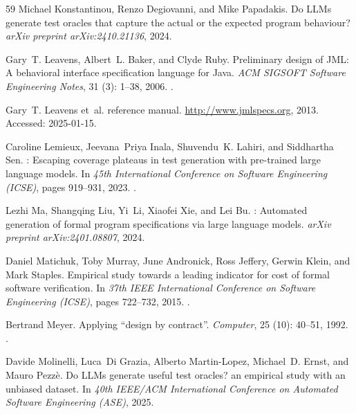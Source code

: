 \documentclass[11pt]{article}
\begin{document}
\begin{thebibliography}{59}
Michael Konstantinou, Renzo Degiovanni, and Mike Papadakis.
\newblock Do {LLM}s generate test oracles that capture the actual or the
  expected program behaviour?
\newblock \emph{arXiv preprint arXiv:2410.21136}, 2024.

Gary~T. Leavens, Albert~L. Baker, and Clyde Ruby.
\newblock Preliminary design of {JML}: A behavioral interface specification
  language for {Java}.
\newblock \emph{ACM SIGSOFT Software Engineering Notes}, 31
  (3): 1--38, 2006.
\newblock {}.

Gary~T. Leavens et~al.
 reference manual.
\newblock \url{http://www.jmlspecs.org}, 2013.
\newblock Accessed: 2025-01-15.

Caroline Lemieux, Jeevana~Priya Inala, Shuvendu~K. Lahiri, and Siddhartha Sen.
: Escaping coverage plateaus in test generation with
  pre-trained large language models.
\newblock In \emph{45th International Conference on Software Engineering
  (ICSE)}, pages 919--931, 2023.
\newblock {}.

Lezhi Ma, Shangqing Liu, Yi~Li, Xiaofei Xie, and Lei Bu.
: Automated generation of formal program specifications via
  large language models.
\newblock \emph{arXiv preprint arXiv:2401.08807}, 2024.

Daniel Matichuk, Toby Murray, June Andronick, Ross Jeffery, Gerwin Klein, and
  Mark Staples.
\newblock Empirical study towards a leading indicator for cost of formal
  software verification.
\newblock In \emph{37th IEEE International Conference on Software Engineering
  (ICSE)}, pages 722--732, 2015.
\newblock {}.

Bertrand Meyer.
\newblock Applying ``design by contract''.
\newblock \emph{Computer}, 25 (10): 40--51, 1992.
\newblock {}.

Davide Molinelli, Luca~Di Grazia, Alberto Martin-Lopez, Michael~D. Ernst, and
  Mauro Pezz{\`e}.
\newblock Do {LLM}s generate useful test oracles? an empirical study with an
  unbiased dataset.
\newblock In \emph{40th IEEE/ACM International Conference on Automated Software
  Engineering (ASE)}, 2025.


\end{thebibliography}
\end{document}
